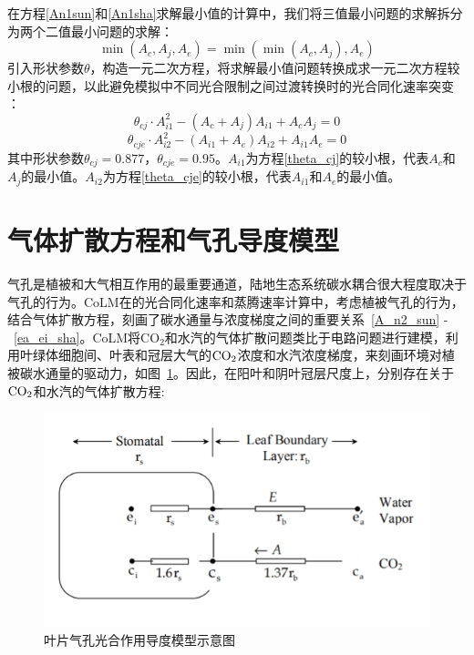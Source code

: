 在方程\eqref{An1sun}和\eqref{An1sha}求解最小值的计算中，我们将三值最小问题的求解拆分为两个二值最小问题的求解：
\begin{equation}\label{min_Ac_Aj_Ae}
\min \left(A_{c}, A_{j}, A_{e}\right)=\min \left(\min \left(A_{c}, A_{j}\right), A_{e}\right)
\end{equation}
引入形状参数$\theta$，构造一元二次方程，将求解最小值问题转换成求一元二次方程较小根的问题，以此避免模拟中不同光合限制之间过渡转换时的光合同化速率突变 \citep{collatz1991,collatz1992}：
\begin{equation}\label{theta_cj}
\theta_{c j} \cdot A_{i1}^{2}-\left(A_{c}+A_{j}\right) A_{i1}+A_{c} A_{j}=0
\end{equation}
\begin{equation}\label{theta_cje}
\theta_{c j e} \cdot A_{i2}^{2}-\left(A_{i1}+A_{e}\right) A_{i2}+A_{i1} A_{e}=0
\end{equation}
其中形状参数$\theta_{cj}=0.877$，$\theta_{cje}=0.95$。$A_{i1}$为方程\eqref{theta_cj}的较小根，代表$A_c$和$A_j$的最小值。$A_{i2}$为方程\eqref{theta_cje}的较小根，代表$A_{i1}$和$A_e$的最小值。


\section{气体扩散方程和气孔导度模型}\label{气体扩散方程和气孔导度模型}
气孔是植被和大气相互作用的最重要通道，陆地生态系统碳水耦合很大程度取决于气孔的行为。CoLM在的光合同化速率和蒸腾速率计算中，考虑植被气孔的行为，结合气体扩散方程，刻画了碳水通量与浓度梯度之间的重要关系~\eqref{A_n2_sun} -~\eqref{ea_ei_sha}。CoLM将CO$_2$和水汽的气体扩散问题类比于电路问题进行建模，利用叶绿体细胞间、叶表和冠层大气的$\rm CO_2$浓度和水汽浓度梯度，来刻画环境对植被碳水通量的驱动力，如图~\ref{fig:叶片气孔光合作用导度模型示意图}。因此，在阳叶和阴叶冠层尺度上，分别存在关于$\rm CO_2$和水汽的气体扩散方程:

{
\begin{figure}[htbp]
\centering
\includegraphics{Figures/气孔导度和光合作用/叶片气孔光合作用导度模型示意图.png}
\caption{叶片气孔光合作用导度模型示意图}
\label{fig:叶片气孔光合作用导度模型示意图}
\end{figure}
}

